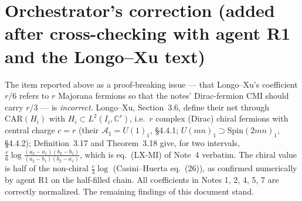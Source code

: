 \documentclass[11pt]{article}
\begin{document}
\section*{Orchestrator's correction (added after cross-checking with agent R1 and the Longo--Xu text)}
\begin{verdictok}
The item reported above as a proof-breaking issue --- that Longo--Xu's coefficient \(r/6\) refers to \(r\) Majorana fermions so that the notes' Dirac-fermion CMI should carry \(r/3\) --- is \emph{incorrect}.  Longo--Xu, Section~3.6, define their net through \(\mathrm{CAR}(H_i)\) with \(H_i\subset L^2(I_i,\mathbb C^r)\), i.e.\ \(r\) complex (Dirac) chiral fermions with central charge \(c=r\) (their \(\mathcal A_1=U(1)_1\), \S4.4.1; \(U(mn)_1\supset\mathrm{Spin}(2mn)_1\), \S4.4.2); Definition~3.17 and Theorem~3.18 give, for two intervals, \(\frac r6\log\frac{(a_2-a_1)(b_2-b_1)}{(a_2-b_1)(b_2-a_1)}\), which is eq.\ (LX-MI) of Note~4 verbatim.  The chiral value is half of the non-chiral \(\frac c3\log\) (Casini--Huerta eq.~(26)), as confirmed numerically by agent R1 on the half-filled chain.  All coefficients in Notes 1, 2, 4, 5, 7 are correctly normalized.  The remaining findings of this document stand.
\end{verdictok}
\end{document}
